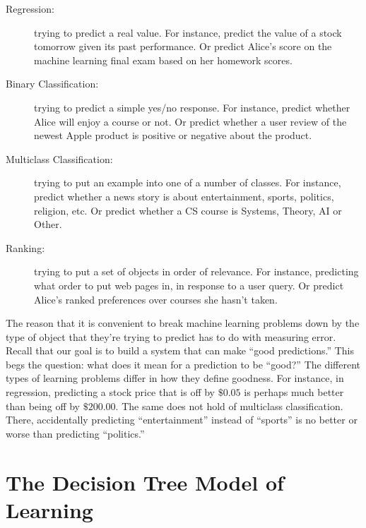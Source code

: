 \begin{description}
\item[Regression:] trying to predict a real value.  For instance,
  predict the value of a stock tomorrow given its past performance.
  Or predict Alice's score on the machine learning final exam based on
  her homework scores.

\item[Binary Classification:] trying to predict a simple yes/no
  response.  For instance, predict whether Alice will enjoy a course
  or not.  Or predict whether a user review of the newest Apple
  product is positive or negative about the product.

\item[Multiclass Classification:] trying to put an example into one of
  a number of classes.  For instance, predict whether a news story is
  about entertainment, sports, politics, religion, etc.  Or predict
  whether a CS course is Systems, Theory, AI or Other.

\item[Ranking:] trying to put a set of objects in order of relevance.
  For instance, predicting what order to put web pages in, in response
  to a user query.  Or predict Alice's ranked preferences over courses
  she hasn't taken.
\end{description}


The reason that it is convenient to break machine learning problems
down by the type of object that they're trying to predict has to do
with measuring error.  Recall that our goal is to build a system that
can make ``good predictions.''  This begs the question: what does it
mean for a prediction to be ``good?''  The different types of learning
problems differ in how they define goodness.  For instance, in
regression, predicting a stock price that is off by $\$0.05$ is
perhaps much better than being off by $\$200.00$.  The same does not
hold of multiclass classification.  There, accidentally predicting
``entertainment'' instead of ``sports'' is no better or worse than
predicting ``politics.''




\section{The Decision Tree Model of Learning}

